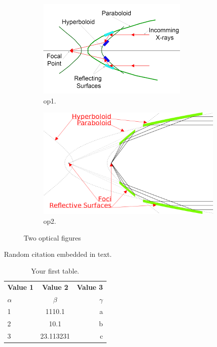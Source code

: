 \documentclass{article}
\begin{document}
	\begin{figure}[h!]
		\centering
		\begin{subfigure}[b]{0.4\linewidth}
			\includegraphics[width=\linewidth]{op1.png}
			\caption{op1.}
		\end{subfigure}
		\begin{subfigure}[b]{0.4\linewidth}
			\includegraphics[width=\linewidth]{op2.png}
			\caption{op2.}
		\end{subfigure}
		\caption{Two optical figures}
		\label{fig:ops}
	\end{figure}

	Random citation \cite{Michette2013} embedded in text.

	\newpage

	
	

\begin{table}[h!]
  \begin{center}
    \caption{Your first table.}
    \label{tab:table1}
    \begin{tabular}{l|c|r} %
      \textbf{Value 1} & \textbf{Value 2} & \textbf{Value 3}\\
      $\alpha$ & $\beta$ & $\gamma$ \\
      \hline
      1 & 1110.1 & a\\
      2 & 10.1 & b\\
      3 & 23.113231 & c\\
    \end{tabular}
  \end{center}
\end{table}
\end{document}
